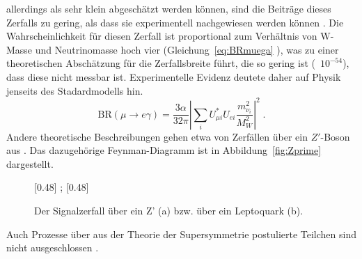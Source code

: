allerdings als sehr klein abgeschätzt werden können, sind die Beiträge dieses Zerfalls zu gering, als dass sie experimentell nachgewiesen
werden können \cite{neutrino}. Die Wahrscheinlichkeit für diesen Zerfall ist proportional zum Verhältnis von W-Masse und Neutrinomasse
hoch vier (Gleichung~\ref{eq:BRmuega} \cite{neutrino}), was zu einer theoretischen Abschätzung für die Zerfallsbreite führt, die so
gering ist (~$10^{-54}$), dass diese nicht messbar ist. Experimentelle Evidenz deutete daher auf Physik jenseits des Stadardmodells hin.
%
\begin{equation}
  \label{eq:BRmuega}
  \text{BR}(\mu\rightarrow e\gamma)=\frac{3\alpha}{32\pi}\left|\sum_i U_{\mu i}^*U_{ei}\frac{m^2_{\nu_i}}{M^2_W}\right|^2\; .
\end{equation}
%
Andere theoretische Beschreibungen gehen etwa von Zerfällen über ein $Z'$-Boson aus \cite{zprime}. Das dazugehörige Feynman-Diagramm
ist in Abbildung~\ref{fig:Zprime} dargestellt.
%
\begin{figure}
    \subcaptionbox{\label{fig:Zprime}}[0.48\textwidth]{
        ;}
    \subcaptionbox{\label{fig:lepto}}[0.48\textwidth]{
        }
  \caption{Der Signalzerfall über ein Z' (a) bzw. über ein Leptoquark (b).}
\end{figure}
%
Auch Prozesse über aus der Theorie der Supersymmetrie postulierte Teilchen sind nicht ausgeschlossen \cite{susy_gut2}.
